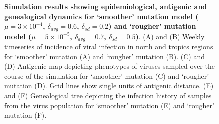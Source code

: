 \documentclass[11pt,oneside,letterpaper]{article}
\begin{document}
\vspace*{\fill}
\begin{figure}[H]
	\centering
	\caption{\textbf{Simulation results showing epidemiological, antigenic and genealogical dynamics for `smoother' mutation model ($\mu = 3 \times 10^{-4}$, $\delta_{avg} = 0.6$, $\delta_{sd} = 0.2$) and `rougher' mutation model ($\mu = 5 \times 10^{-5}$, $\delta_{avg} = 0.7$, $\delta_{sd} = 0.5$)}. (A) and (B) Weekly timeseries of incidence of viral infection in north and tropics regions for `smoother' mutation (A) and `rougher' mutation (B). (C) and (D) Antigenic map depicting phenotypes of viruses sampled over the course of the simulation for `smoother' mutation (C) and `rougher' mutation (D).  Grid lines show single units of antigenic distance. (E) and (F) Genealogical tree depicting the infection history of samples from the virus population for `smoother' mutation (E) and `rougher' mutation (F).}
	\label{mutationcomp}
\end{figure}
\vspace*{\fill}

\pagebreak
\end{document}

